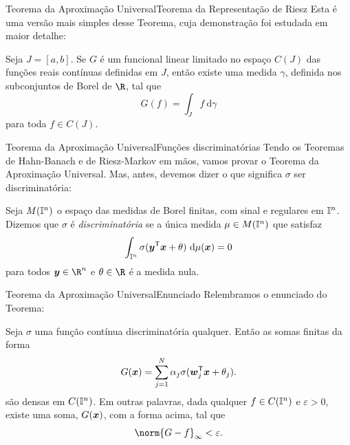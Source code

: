 \documentclass[13pt]{beamer}
\begin{document}
\begin{frame}{Teorema da Aproximação Universal}{Teorema da Representação de Riesz}%
    Esta é uma versão mais simples desse Teorema, cuja demonstração foi estudada em maior detalhe:
    \begin{teo*}
        Seja \( J = [a, b] \).
        Se \( G \) é um funcional linear limitado no espaço \( C ( J ) \) das funções reais contínuas definidas em \( J \), então existe uma medida \( \gamma \), definida nos subconjuntos de Borel de \( \R \), tal que
        \begin{equation*}
            G ( f ) = \int_{ J } f \ \mathrm{d} \gamma
        \end{equation*}
        para toda \( f \in C ( J ) \).
    \end{teo*}
\end{frame}



\begin{frame}{Teorema da Aproximação Universal}{Funções discriminatórias}
    Tendo os Teoremas de Hahn-Banach e de Riesz-Markov em mãos, vamos provar o Teorema da Aproximação Universal.
    Mas, antes, devemos dizer o que significa \( \sigma \) ser discriminatória:
    \begin{defn*}
        Seja \( M ( \mathbb{I}^{ n } ) \) o espaço das medidas de Borel finitas, com sinal e regulares em \( \mathbb{I}^{ n } \).
        Dizemos que \( \sigma \) é \emph{discriminatória} se a única medida \( \mu \in M ( \mathbb{I}^{ n } ) \) que satisfaz
        \begin{equation*}
            \int_{ \mathbb{I}^{ n } } \sigma ( \bm{y}^{ \mathsf{T} } \bm{x} + \theta ) \ \mathrm{d} \mu (\bm{x}) = 0
        \end{equation*}
        para todos \( \bfy \in \R^{ n } \) e \( \theta \in \R \) é a medida nula.
    \end{defn*}
\end{frame}

\begin{frame}{Teorema da Aproximação Universal}{Enunciado}
    Relembramos o enunciado do Teorema:
    \begin{TAU}
        Seja \( \sigma \) uma função contínua discriminatória qualquer.
        Então as somas finitas da forma
        \begin{equation*}
            G ( \bm{x} ) = \sum_{ j=1 }^{ N } \alpha_{ j } \sigma ( \bm{w}_{ j }^{ \mathsf{T} } \bm{x} + \theta_{ j } )
        .\end{equation*}
        são densas em \( C ( \mathbb{I}^{ n } ) \).
        Em outras palavras, dada qualquer \( f \in C ( \mathbb{I}^{ n } ) \) e \( \varepsilon > 0 \), existe uma soma, \( G ( \bm{x} ) \), com a forma acima, tal que
        \begin{equation*}
            \norm{ G - f }_{ \infty } < \varepsilon
        .\end{equation*}
    \end{TAU}
\end{frame}
\end{document}
